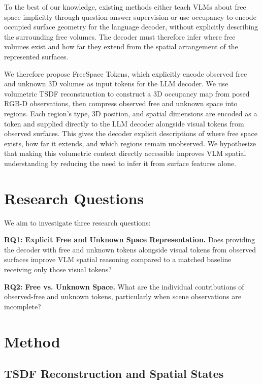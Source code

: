 \documentclass[10pt,twocolumn,letterpaper]{article}
\begin{document}
To the best of our knowledge, existing methods either teach VLMs about free space implicitly through question-answer supervision or use occupancy to encode occupied surface geometry for the language decoder, without explicitly describing the surrounding free volumes. The decoder must therefore infer where free volumes exist and how far they extend from the spatial arrangement of the represented surfaces.

We therefore propose FreeSpace Tokens, which explicitly encode observed free and unknown 3D volumes as input tokens for the LLM decoder. We use volumetric TSDF reconstruction to construct a 3D occupancy map from posed RGB-D observations, then compress observed free and unknown space into regions. Each region’s type, 3D position, and spatial dimensions are encoded as a token and supplied directly to the LLM decoder alongside visual tokens from observed surfaces. This gives the decoder explicit descriptions of where free space exists, how far it extends, and which regions remain unobserved. We hypothesize that making this volumetric context directly accessible improves VLM spatial understanding by reducing the need to infer it from surface features alone.

\section{Research Questions}

We aim to investigate three research questions:

\textbf{RQ1: Explicit Free and Unknown Space Representation.} Does providing the decoder with free and unknown tokens alongside visual tokens from observed surfaces improve VLM spatial reasoning compared to a matched baseline receiving only those visual tokens?

\textbf{RQ2: Free vs. Unknown Space.} What are the individual contributions of observed-free and unknown tokens, particularly when scene observations are incomplete?

\section{Method}

\subsection{TSDF Reconstruction and Spatial States}
\end{document}
